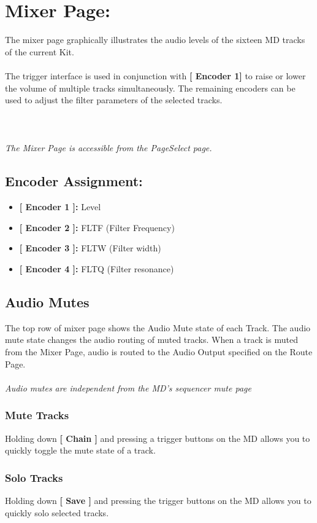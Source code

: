 \chapter{Mixer Page:}
The mixer page graphically illustrates the audio  levels of the sixteen MD tracks of the current Kit.\\
\\
The trigger interface is used in conjunction with \textbf{[ Encoder 1]} to raise or lower the volume of multiple tracks simultaneously. The remaining encoders can be used to adjust the filter parameters of the selected tracks. \\
\\
\\\\
\textit{The Mixer Page is accessible from the PageSelect page.}
\section{Encoder Assignment:}
\begin{itemize}
	\item \textbf{[ Encoder 1 ]: } Level
	\item \textbf{[ Encoder 2 ]: } FLTF (Filter Frequency)
    \item \textbf{[ Encoder 3 ]: } FLTW (Filter width)
	\item \textbf{[ Encoder 4 ]: } FLTQ (Filter resonance)
\end{itemize}


\section{Audio Mutes}
The top row of mixer page shows the Audio Mute state of each Track. The audio mute state changes the audio routing of muted tracks. When a track is muted from the Mixer Page, audio is routed to the Audio Output specified on the Route Page.\\
\\
\textit{Audio mutes are independent from the MD's sequencer mute page} \\
\subsection{Mute Tracks}Holding down \textbf{[ Chain ]} and pressing a trigger buttons on the MD allows you to quickly toggle the mute state of a track.
\subsection{Solo Tracks}
Holding down \textbf{[ Save ]} and pressing the trigger buttons on the MD allows you to quickly solo selected tracks.
